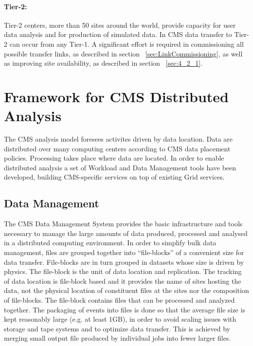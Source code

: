 \paragraph{Tier-2:}
Tier-2 centers, more than 50 sites around the world,  provide capacity for user data analysis and for production of simulated data.
In CMS data transfer to Tier-2 can occur from any Tier-1. A significant effort is required in 
commissioning all possible transfer links, as described in section ~\ref{sec:LinkCommissioning}, as well
as improving site availability, as described in section ~\ref{sec:4_2_1}.

\section{Framework for CMS Distributed Analysis}
\label{sec:3}
The CMS analysis model foresees activites driven by data location. Data are distributed over many computing centers according to CMS data placement policies. Processing takes place where data are located. In order to enable distributed analysis a set of Workload and Data Management tools have been developed, building CMS-specific services on top of existing Grid services.

\subsection{Data Management}
\label{sec:3_1}
The CMS Data Management System provides the basic infrastructure and tools necessary to manage the large amounts of data produced, processed and analysed in a distributed computing environment. 
In order to simplify bulk data management, files are grouped together into “file-blocks”  of a convenient size for data transfer. %
File-blocks are in turn grouped in datasets whose size is driven by physics.
The file-block is the unit of data location and replication. 
The tracking of data location is file-block based and it provides the name of sites hosting the data, not the physical location of constituent files at the sites nor the composition of file-blocks.
The file-block contains files that can be processed and analyzed together.
The packaging of events into files is done so that the average file size is
kept reasonably large (e.g. at least 1GB), in order to avoid scaling issues with storage and tape systems and to optimize data transfer.
This is achieved by merging small output file produced by individual jobs into fewer larger files.


